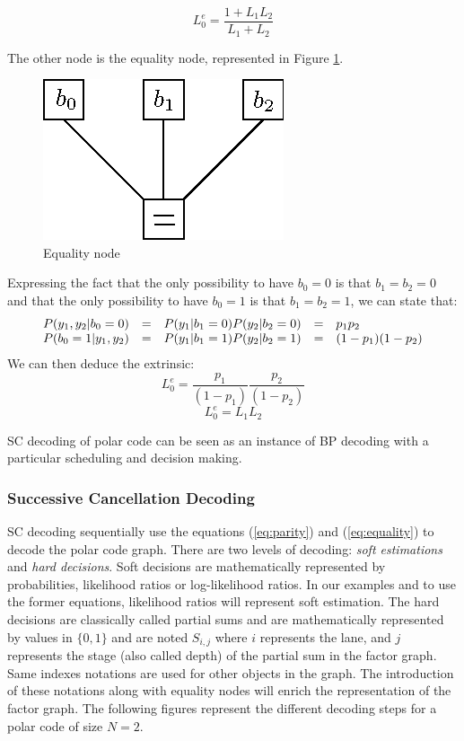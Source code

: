 \begin{equation}
L^e_0=\dfrac{1 + L_1L_2}{L_1+L_2}
\label{eq:parity}
\end{equation}

The other node is the equality node, represented in Figure \ref{fig:equality}.

\begin{figure}[t]
\centering
\includegraphics{tail/appendix_1_fig/equality}
\caption{Equality node}
\label{fig:equality}
\end{figure}

Expressing the fact that the only possibility to have $b_0=0$ is that $b_1 = b_2 = 0$ and that the only possibility to have $b_0=1$ is that $b_1=b_2=1$, we can state that:
\begin{eqnarray*}
\begin{array}{r c c c l}
P(y_1,y_2|b_0=0) & = & P(y_1|b_1=0) P(y_2 | b_2 = 0) & = & p_1p_2 \\
P(b_0=1|y_1,y_2) & = & P(y_1|b_1=1) P(y_2 | b_2 = 1) & = & (1-p_1)(1-p_2)
\end{array}
\end{eqnarray*}
We can then deduce the extrinsic:
\begin{equation*}
L^e_0=\dfrac{p_1}{(1-p_1)}\dfrac{p_2}{(1-p_2)}
\end{equation*}
\begin{equation}
L^e_0=L_1L_2
\label{eq:equality}
\end{equation}

SC decoding of polar code can be seen as an instance of BP decoding with a particular scheduling and decision making.

\subsubsection{Successive Cancellation Decoding}
SC decoding sequentially use the equations  (\ref{eq:parity}) and (\ref{eq:equality}) to decode the polar code graph.
There are two levels of decoding: \textit{soft estimations} and \textit{hard decisions}. Soft decisions are mathematically represented by probabilities, likelihood ratios or log-likelihood ratios. In our examples and to use the former equations, likelihood ratios will represent soft estimation. The hard decisions are classically called partial sums and are mathematically represented by values in $\{0,1\}$ and are noted $S_{i,j}$ where $i$ represents the lane, and $j$ represents the stage (also called depth) of the partial sum in the factor graph. Same indexes notations are used for other objects in the graph. The introduction of these notations along with equality nodes will enrich the representation of the factor graph. The following figures represent the different decoding steps for a polar code of size $N=2$.

